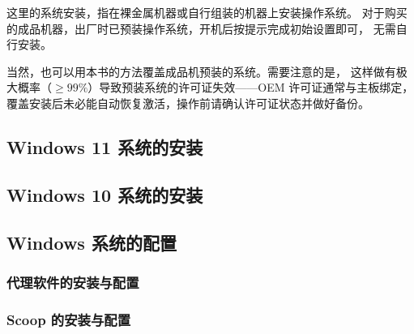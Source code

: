 这里的系统安装，指在裸金属机器或自行组装的机器上安装操作系统。
对于购买的成品机器，出厂时已预装操作系统，开机后按提示完成初始设置即可，
无需自行安装。

当然，也可以用本书的方法覆盖成品机预装的系统。需要注意的是，
这样做有极大概率（$\geq 99\%$）导致预装系统的许可证失效——OEM 许可证通常与主板绑定，
覆盖安装后未必能自动恢复激活，操作前请确认许可证状态并做好备份。

\subsection{Windows 11 系统的安装}

\subsection{Windows 10 系统的安装}

\subsection{Windows 系统的配置}

\subsubsection{代理软件的安装与配置}

\subsubsection{Scoop 的安装与配置}